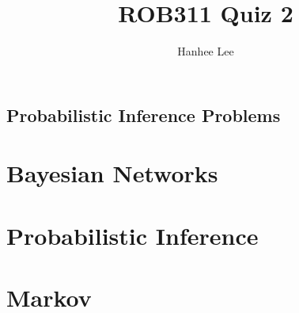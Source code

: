 \documentclass{article}
\title{ROB311 Quiz 2}
\author{Hanhee Lee}
\begin{document}
\maketitle

\tableofcontents
\newpage

\begin{center}
    \section*{Probabilistic Inference Problems}
\end{center}

\section{Bayesian Networks}

\newpage

\section{Probabilistic Inference}

\newpage

\section{Markov}

\newpage
\end{document}
